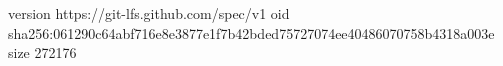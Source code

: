 version https://git-lfs.github.com/spec/v1
oid sha256:061290c64abf716e8e3877e1f7b42bded75727074ee40486070758b4318a003e
size 272176
